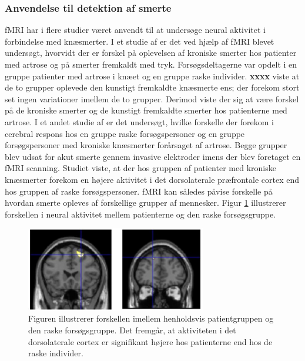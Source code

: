 \subsubsection{Anvendelse til detektion af smerte}
fMRI har i flere studier været anvendt til at undersøge neural aktivitet i forbindelse med knæsmerter.
I et studie af \citep{Parks2012} er det ved hjælp af fMRI blevet undersøgt, hvorvidt der er forskel på oplevelsen af kroniske smerter hos patienter med artrose og på smerter fremkaldt med tryk. Forsøgsdeltagerne var opdelt i en gruppe patienter med artrose i knæet og en gruppe raske individer. \textbf{xxxx} viste at de to grupper oplevede den kunstigt fremkaldte knæsmerte ens; der forekom stort set ingen variationer imellem de to grupper. Derimod viste der sig at være forskel på de kroniske smerter og de kunstigt fremkaldte smerter hos patienterne med artrose. \citep{Parks2012} 
I et andet studie af \citep{Hiramatsu2014} er det undersøgt, hvilke forskelle der forekom i cerebral respons hos en gruppe raske forsøgspersoner og en gruppe forsøgspersoner med kroniske knæsmerter forårsaget af artrose. Begge grupper blev udsat for akut smerte gennem invasive elektroder imens der blev foretaget en fMRI scanning. Studiet viste, at der hos gruppen af patienter med kroniske knæsmerter forekom en højere aktivitet i det dorsolaterale præfrontale cortex end hos gruppen af raske forsøgspersoner. \citep{Hiramatsu2014} 
fMRI kan således påvise forskelle på hvordan smerte opleves af forskellige grupper af mennesker. Figur \ref{fig:fMRI_result} illustrerer forskellen i neural aktivitet mellem patienterne og den raske forsøgsgruppe.
\begin{figure}[H] 
	\begin{center}
		\includegraphics[width=0.7\textwidth]{figures/bProblemanalyse/fMRI_dorsolateral}
	\end{center}
	\caption{Figuren illustrerer forskellen imellem henholdsvis patientgruppen og den raske forsøgsgruppe. Det fremgår, at aktiviteten i det dorsolaterale cortex er signifikant højere hos patienterne end hos de raske individer. \citep{Hiramatsu2014}} 
	\label{fig:fMRI_result} 
\end{figure} 


